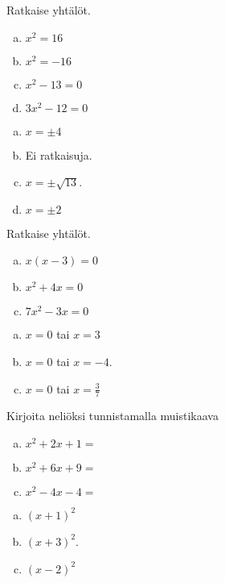 \begin{tehtava}
    Ratkaise yhtälöt.
    \begin{enumerate}[a)]
        \item $x^2 = 16$
        \item $x^2 = - 16$
        \item $x^2 - 13 = 0$
        \item $3x^2 - 12 = 0$

    \end{enumerate}
    \begin{vastaus}
        \begin{enumerate}[a)]
            \item $x=\pm 4$
            \item Ei ratkaisuja. 
            \item $x = \pm \sqrt{13}$.
            \item $x=\pm 2$ 
        \end{enumerate}
    \end{vastaus}
\end{tehtava}

\begin{tehtava}
    Ratkaise yhtälöt.
    \begin{enumerate}[a)]
        \item $x(x-3)= 0$
        \item $x^2 + 4x = 0$
        \item $7x^2-3x = 0$
    \end{enumerate}
    \begin{vastaus}
        \begin{enumerate}[a)]
            \item $x=0$ tai $x=3$
            \item $x =0$ tai $x=-4$.
            \item $x=0$ tai $x=\frac{3}{7}$     
        \end{enumerate}
    \end{vastaus}
\end{tehtava}

\begin{tehtava}
    Kirjoita neliöksi tunnistamalla muistikaava
    \begin{enumerate}[a)]
        \item $x^2 +2x +1 =$
        \item $x^2 +6x +9 = $
        \item $x^2 -4x -4 = $
    \end{enumerate}
    \begin{vastaus}
        \begin{enumerate}[a)]
            \item $(x+1)^2$
            \item $(x+3)^2$.
            \item $(x-2)^2$     
        \end{enumerate}
    \end{vastaus}
\end{tehtava}


